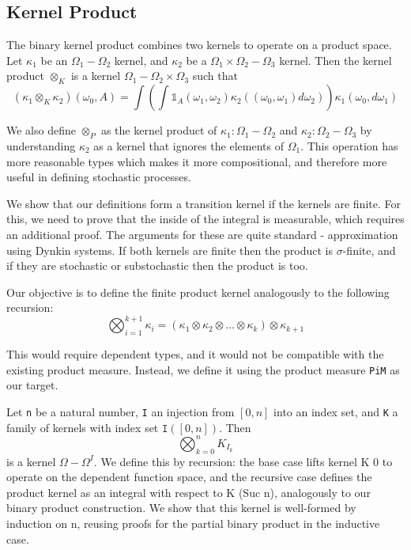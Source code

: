 \documentclass[orivec, envcountsame]{llncs}
\begin{document}
\subsection{Kernel Product}
The binary kernel product combines two kernels to operate on a product space. Let \(\kappa_1\) be an \(\Omega_1 - \Omega_2\) kernel, and \(\kappa_2\) be a \(\Omega_1 \times \Omega_2 - \Omega_3\) kernel. Then the kernel product \(\otimes_K\) is a kernel \(\Omega_1 - \Omega_2 \times \Omega_3\) such that
\[(\kappa_1 \otimes_K \kappa_2)(\omega_0, A) = \int\left(\int \mathbb{1}_A(\omega_1, \omega_2)\kappa_2((\omega_0, \omega_1)d\omega_2)\right)\kappa_1(\omega_0, d\omega_1)\]

We also define \(\otimes_P\) as the kernel product of \(\kappa_1: \Omega_1 - \Omega_2\) and \(\kappa_2: \Omega_2 - \Omega_3\) by understanding \(\kappa_2\) as a kernel that ignores the elements of \(\Omega_1\). This operation has more reasonable types which makes it more compositional, and therefore more useful in defining stochastic processes.

We show that our definitions form a transition kernel if the kernels are finite. For this, we need to prove that the inside of the integral is measurable, which requires an additional proof. The arguments for these are quite standard - approximation using Dynkin systems. If both kernels are finite then the product is \(\sigma\)-finite, and if they are stochastic or substochastic then the product is too.

Our objective is to define the finite product kernel analogously to the following recursion:
\[\bigotimes_{i=1}^{k+1} \kappa_i = (\kappa_1 \otimes \kappa_2 \otimes \dots \otimes \kappa_{k}) \otimes \kappa_{k+1}\]

This would require dependent types, and it would not be compatible with the existing product measure. Instead, we define it using the product measure \texttt{PiM} as our target.

Let \texttt{n} be a natural number, \texttt{I} an injection from \([0,n]\) into an index set, and \texttt{K} a family of kernels with index set \(\texttt{I}([0,n])\). Then \[\bigotimes_{k=0}^n K_{I_k}\] is a kernel \(\Omega - \Omega^I\). We define this by recursion: the base case lifts kernel K 0 to operate on the dependent function space, and the recursive case defines the product kernel as an integral with respect to K (Suc n), analogously to our binary product construction. We show that this kernel is well-formed by induction on n, reusing proofs for the partial binary product in the inductive case.
\end{document}
